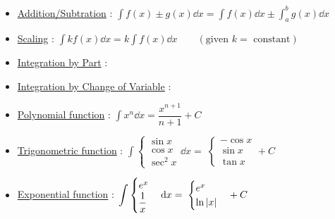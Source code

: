 \documentclass[class=article, crop=false, 12pt]{standalone}
\begin{document}
\begin{itemize}
    \item \ul{Addition/Subtration} : $\displaystyle \int f(x) \pm g(x) \dd{x} = \int f(x) \dd{x} \pm \int_a^b g(x) \dd{x}$
    
    \item \ul{Scaling} : $\displaystyle \int kf(x) \dd{x} = k \int f(x) \dd{x}\qquad (\text{given }k = \text{ constant})$

    \item \ul{Integration by Part}  :

    \item \ul{Integration by Change of Variable}  :

    \item \ul{Polynomial function} : $\displaystyle \int x^n \dd{x} = \dfrac{x^{n+1}}{n+1} +C$ 
    
    \item \ul{Trigonometric function} : $\displaystyle \int
        \begin{cases} \sin{x}\\ \cos{x}\\ \sec^2{x} \end{cases} \dd{x}
        =\;
        \begin{cases} -\cos{x}\\ \sin{x}\\ \tan{x} \end{cases} +C
        $

    \item \ul{Exponential function} : $\displaystyle \int
        \begin{cases} e^{x}\\ \dfrac{1}{x} \end{cases} \dd{x}
        =\;
        \begin{cases} e^{x}\\ \ln{|x|} \end{cases}  +C
        $


\end{itemize}
\end{document}
